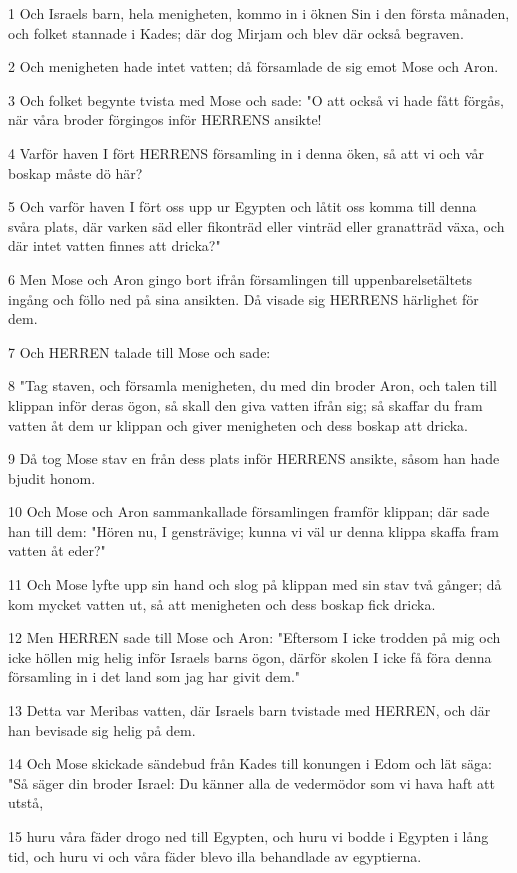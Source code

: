 \par 1 Och Israels barn, hela menigheten, kommo in i öknen Sin i den första månaden, och folket stannade i Kades; där dog Mirjam och blev där också begraven.
\par 2 Och menigheten hade intet vatten; då församlade de sig emot Mose och Aron.
\par 3 Och folket begynte tvista med Mose och sade: "O att också vi hade fått förgås, när våra broder förgingos inför HERRENS ansikte!
\par 4 Varför haven I fört HERRENS församling in i denna öken, så att vi och vår boskap måste dö här?
\par 5 Och varför haven I fört oss upp ur Egypten och låtit oss komma till denna svåra plats, där varken säd eller fikonträd eller vinträd eller granatträd växa, och där intet vatten finnes att dricka?"
\par 6 Men Mose och Aron gingo bort ifrån församlingen till uppenbarelsetältets ingång och föllo ned på sina ansikten. Då visade sig HERRENS härlighet för dem.
\par 7 Och HERREN talade till Mose och sade:
\par 8 "Tag staven, och församla menigheten, du med din broder Aron, och talen till klippan inför deras ögon, så skall den giva vatten ifrån sig; så skaffar du fram vatten åt dem ur klippan och giver menigheten och dess boskap att dricka.
\par 9 Då tog Mose stav en från dess plats inför HERRENS ansikte, såsom han hade bjudit honom.
\par 10 Och Mose och Aron sammankallade församlingen framför klippan; där sade han till dem: "Hören nu, I gensträvige; kunna vi väl ur denna klippa skaffa fram vatten åt eder?"
\par 11 Och Mose lyfte upp sin hand och slog på klippan med sin stav två gånger; då kom mycket vatten ut, så att menigheten och dess boskap fick dricka.
\par 12 Men HERREN sade till Mose och Aron: "Eftersom I icke trodden på mig och icke höllen mig helig inför Israels barns ögon, därför skolen I icke få föra denna församling in i det land som jag har givit dem."
\par 13 Detta var Meribas vatten, där Israels barn tvistade med HERREN, och där han bevisade sig helig på dem.
\par 14 Och Mose skickade sändebud från Kades till konungen i Edom och lät säga: "Så säger din broder Israel: Du känner alla de vedermödor som vi hava haft att utstå,
\par 15 huru våra fäder drogo ned till Egypten, och huru vi bodde i Egypten i lång tid, och huru vi och våra fäder blevo illa behandlade av egyptierna.
